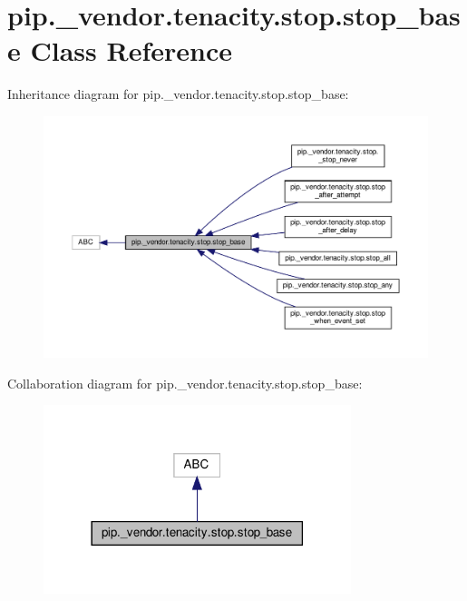 \hypertarget{classpip_1_1__vendor_1_1tenacity_1_1stop_1_1stop__base}{}\section{pip.\+\_\+vendor.\+tenacity.\+stop.\+stop\+\_\+base Class Reference}
\label{classpip_1_1__vendor_1_1tenacity_1_1stop_1_1stop__base}


Inheritance diagram for pip.\+\_\+vendor.\+tenacity.\+stop.\+stop\+\_\+base\+:
\nopagebreak
\begin{figure}[H]
\begin{center}
\leavevmode
\includegraphics[width=350pt]{classpip_1_1__vendor_1_1tenacity_1_1stop_1_1stop__base__inherit__graph}
\end{center}
\end{figure}


Collaboration diagram for pip.\+\_\+vendor.\+tenacity.\+stop.\+stop\+\_\+base\+:
\nopagebreak
\begin{figure}[H]
\begin{center}
\leavevmode
\includegraphics[width=254pt]{classpip_1_1__vendor_1_1tenacity_1_1stop_1_1stop__base__coll__graph}
\end{center}
\end{figure}
